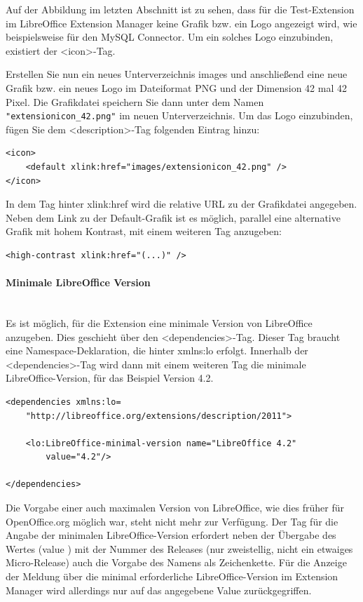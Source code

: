 \documentclass[a4paper,10pt,pagesize,titlepage]{scrbook}
\begin{document}
Auf der Abbildung im letzten Abschnitt ist zu sehen, dass für die Test-Extension im LibreOffice Extension Manager keine Grafik bzw. ein Logo angezeigt wird, wie beispielsweise für den MySQL Connector. Um ein solches Logo einzubinden, existiert der <icon>-Tag.

Erstellen Sie nun ein neues Unterverzeichnis \glqq images \grqq und anschließend eine neue Grafik bzw. ein neues Logo im Dateiformat PNG und der Dimension 42 mal 42 Pixel. Die Grafikdatei speichern Sie dann unter dem Namen \verb|"extensionicon_42.png"| im neuen Unterverzeichnis. Um das Logo einzubinden, fügen Sie dem <description>-Tag folgenden Eintrag hinzu:

\begin{lstlisting}
<icon>
    <default xlink:href="images/extensionicon_42.png" />
</icon>
\end{lstlisting}

In dem Tag hinter \glqq xlink:href \grqq wird die relative URL zu der Grafikdatei angegeben. Neben dem Link zu der Default-Grafik ist es möglich, parallel eine alternative Grafik mit hohem Kontrast, mit einem weiteren Tag anzugeben:
\begin{lstlisting}
<high-contrast xlink:href="(...)" />
\end{lstlisting}

\paragraph*{Minimale LibreOffice Version}$~~$\\

Es ist möglich, für die Extension eine minimale Version von LibreOffice anzugeben. Dies geschieht über den <dependencies>-Tag. Dieser Tag braucht eine Namespace-Deklaration, die hinter \glqq xmlns:lo \grqq erfolgt. Innerhalb der <dependencies>-Tag wird dann mit einem weiteren Tag die minimale LibreOffice-Version, für das Beispiel Version 4.2.

\begin{lstlisting}
<dependencies xmlns:lo=
    "http://libreoffice.org/extensions/description/2011">
    
    <lo:LibreOffice-minimal-version name="LibreOffice 4.2" 
        value="4.2"/>
    
</dependencies>
\end{lstlisting}

Die Vorgabe einer auch maximalen Version von LibreOffice, wie dies früher für OpenOffice.org möglich war, steht nicht mehr zur Verfügung. Der Tag für die Angabe der minimalen LibreOffice-Version erfordert neben der Übergabe des Wertes (\glqq value \grqq ) mit der Nummer des Releases (nur zweistellig, nicht ein etwaiges Micro-Release) auch die Vorgabe des Namens als Zeichenkette. Für die Anzeige der Meldung über die minimal erforderliche LibreOffice-Version im Extension Manager wird allerdings nur auf das angegebene Value zurückgegriffen.
\end{document}
